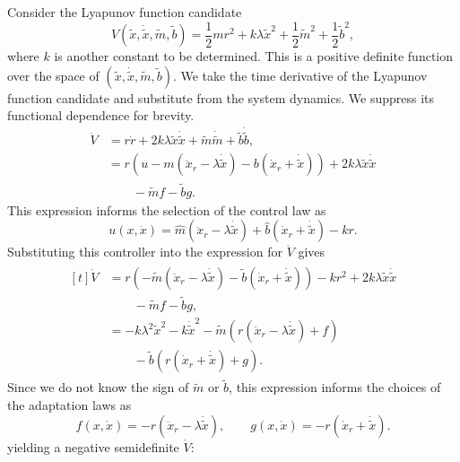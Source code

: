 Consider the Lyapunov function candidate
%
\begin{equation}
    V(\tilde{x}, \dot{\tilde{x}}, \tilde{m}, \tilde{b}) = \frac{1}{2}mr^2 + 
    k\lambda\tilde{x}^2 + \frac{1}{2}\tilde{m}^2 + \frac{1}{2}\tilde{b}^2,
    \label{eq:lyap_cand}
\end{equation}
%
where $k$ is another constant to be determined. This is a positive definite
function over the space of $(\tilde{x}, \dot{\tilde{x}}, \tilde{m}, \tilde{b})$.
We take the time derivative of the Lyapunov function candidate and substitute
from the system dynamics. We suppress its functional dependence for brevity.
%
\begin{align*}
    \dot{V} &= r\dot{r} + 2k\lambda\tilde{x}\dot{\tilde{x}} +
    \tilde{m}\dot{\tilde{m}} + \tilde{b}\dot{\tilde{b}}, \\
    &= r\left(u - m\left(\ddot{x}_r - \lambda\dot{\tilde{x}}\right)
    -b\left(\dot{x}_r + \dot{\tilde{x}} \right)\right) +
    2k\lambda\tilde{x}\dot{\tilde{x}} \\ &\phantom{1234}- \tilde{m}f - \tilde{b}g.
\end{align*}
%
This expression informs the selection of the control law as \[ \boxed{u(x, 
\dot{x}) = \hat{m}\left(\ddot{x}_r - \lambda\dot{\tilde{x}}\right) +
\hat{b}\left(\dot{x}_r + \dot{\tilde{x}}\right) - kr}. \] Substituting this
controller into the expression for $\dot{V}$ gives
%
\begin{align*}
\!\begin{aligned}[t]
    \dot{V} &= r\left(-\tilde{m}\left(\ddot{x}_r - \lambda\dot{\tilde{x}}\right) 
    - \tilde{b}\left(\dot{x}_r+\dot{\tilde{x}}\right)\right) - kr^2
    + 2k\lambda\tilde{x}\dot{\tilde{x}} \\
            &\phantom{1234} -\tilde{m}f - \tilde{b}g, \\
            &= -k\lambda^2\tilde{x}^2 - k\dot{\tilde{x}}^2 -
    \tilde{m}\left(r\left(\ddot{x}_r - \lambda\dot{\tilde{x}}\right) + f\right)
    \\
            &\phantom{1234} -\tilde{b}\left(r\left(\dot{x}_r +
    \dot{\tilde{x}}\right)+g\right).
\end{aligned}
\end{align*}
%
Since we do not know the sign of $\tilde{m}$ or $\tilde{b}$, this expression
informs the choices of the adaptation laws as
\[\boxed{f(x, \dot{x}) = -r\left(\ddot{x}_r - \lambda \dot{\tilde{x}}\right)}, \qquad 
\boxed{g(x, \dot{x}) = -r\left( \dot{x}_r + \dot{\tilde{x}} \right)}. \] yielding a
negative semidefinite $\dot{V}$:
